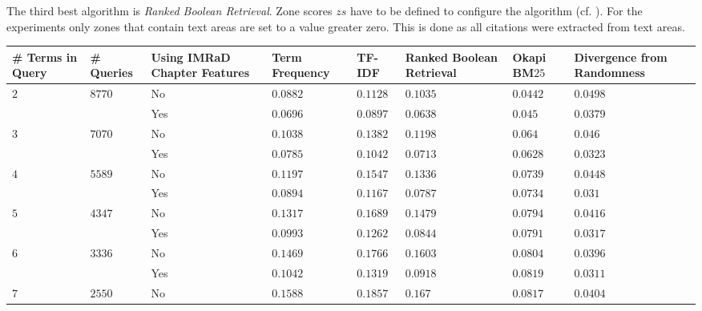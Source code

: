 The third best algorithm is \textit{Ranked Boolean Retrieval}. Zone scores $zs$ have to be defined to configure the algorithm (cf. ). For the experiments only zones that contain text areas are set to a value greater zero. This is done as all citations were extracted from text areas. 
\begin{table}[h]
  \begin{adjustwidth}{-2cm}{}
    \begin{tabular}{ C{1cm} C{1cm} C{2.1cm}|C{2.1cm} C{2.1cm} C{2.1cm} C{2.1cm} C{2.1cm} }
      \toprule
      \textbf{\# Terms in Query} & \textbf{\# Queries} & \textbf{Using IMRaD Chapter Features} & \textbf{Term Frequency} & \textbf{TF-IDF} & \textbf{Ranked Boolean Retrieval} & \textbf{Okapi BM$25$} & \textbf{Divergence from Randomness} \\ \midrule
       &  & No  & $0.0882$ & $0.1128$ & $0.1035$ & $0.0442$ & \color{blue}$\mathbf{0.0498}$  \\
                                                    && Yes & $0.0696$ & $0.0897$ & $0.0638$ & $0.045$  & \color{Plum}$\mathbf{0.0379}$  \\ \midrule
       &  & No  & $0.1038$ & $0.1382$ & $0.1198$ & $0.064$  & $0.046$   \\
                                                    && Yes & $0.0785$ & $0.1042$ & $0.0713$ & $0.0628$ & $0.0323$  \\ \midrule
       &  & No  & $0.1197$ & $0.1547$ & $0.1336$ & $0.0739$ & $0.0448$  \\
                                                    && Yes & $0.0894$ & $0.1167$ & $0.0787$ & $0.0734$ & $0.031$   \\ \midrule
       &  & No  & $0.1317$ & $0.1689$ & $0.1479$ & $0.0794$ & $0.0416$  \\
                                                    && Yes & $0.0993$ & $0.1262$ & $0.0844$ & $0.0791$ & $0.0317$  \\ \midrule
       &  & No  & $0.1469$ & $0.1766$ & $0.1603$ & $0.0804$ & $0.0396$  \\
                                                    && Yes & $0.1042$ & $0.1319$ & $0.0918$ & $0.0819$ & $0.0311$  \\ \midrule
       &  & No  & $0.1588$ & $0.1857$ & $0.167$  & $0.0817$ & $0.0404$  \\

\end{tabular}
\end{adjustwidth}
\end{table}
